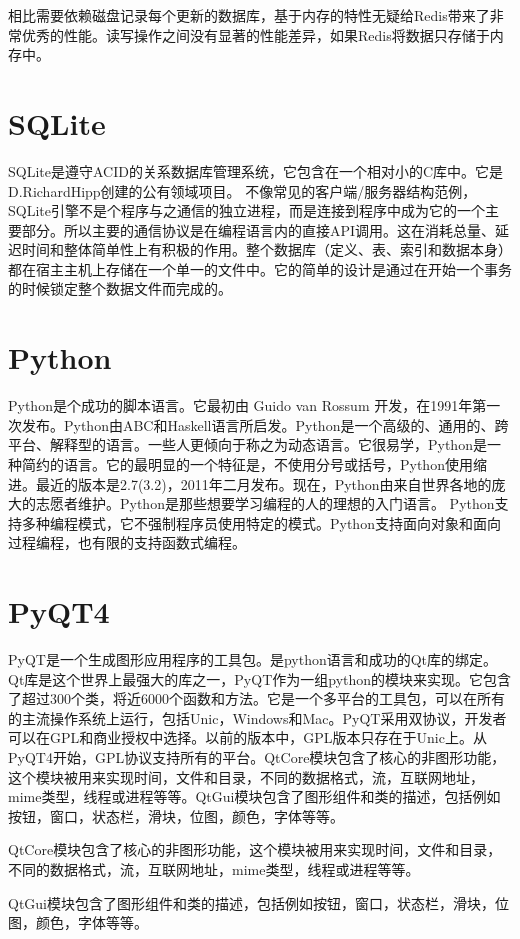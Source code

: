\documentclass{zjutthesis}
\begin{document}
相比需要依赖磁盘记录每个更新的数据库，基于内存的特性无疑给Redis带来了非常优秀的性能。读写操作之间没有显著的性能差异，如果Redis将数据只存储于内存中。


\section{SQLite}
SQLite是遵守ACID的关系数据库管理系统，它包含在一个相对小的C库中。它是D.RichardHipp创建的公有领域项目。
不像常见的客户端/服务器结构范例，SQLite引擎不是个程序与之通信的独立进程，而是连接到程序中成为它的一个主要部分。所以主要的通信协议是在编程语言内的直接API调用。这在消耗总量、延迟时间和整体简单性上有积极的作用。整个数据库（定义、表、索引和数据本身）都在宿主主机上存储在一个单一的文件中。它的简单的设计是通过在开始一个事务的时候锁定整个数据文件而完成的。

\section{Python}
Python是个成功的脚本语言。它最初由 Guido van Rossum 开发，在1991年第一次发布。Python由ABC和Haskell语言所启发。Python是一个高级的、通用的、跨平台、解释型的语言。一些人更倾向于称之为动态语言。它很易学，Python是一种简约的语言。它的最明显的一个特征是，不使用分号或括号，Python使用缩进。最近的版本是2.7(3.2)，2011年二月发布。现在，Python由来自世界各地的庞大的志愿者维护。Python是那些想要学习编程的人的理想的入门语言。
Python支持多种编程模式，它不强制程序员使用特定的模式。Python支持面向对象和面向过程编程，也有限的支持函数式编程。

\section{PyQT4}
PyQT是一个生成图形应用程序的工具包。是python语言和成功的Qt库的绑定。Qt库是这个世界上最强大的库之一，PyQT作为一组python的模块来实现。它包含了超过300个类，将近6000个函数和方法。它是一个多平台的工具包，可以在所有的主流操作系统上运行，包括Unic，Windows和Mac。PyQT采用双协议，开发者可以在GPL和商业授权中选择。以前的版本中，GPL版本只存在于Unic上。从PyQT4开始，GPL协议支持所有的平台。QtCore模块包含了核心的非图形功能，这个模块被用来实现时间，文件和目录，不同的数据格式，流，互联网地址，mime类型，线程或进程等等。QtGui模块包含了图形组件和类的描述，包括例如按钮，窗口，状态栏，滑块，位图，颜色，字体等等。

QtCore模块包含了核心的非图形功能，这个模块被用来实现时间，文件和目录，不同的数据格式，流，互联网地址，mime类型，线程或进程等等。

QtGui模块包含了图形组件和类的描述，包括例如按钮，窗口，状态栏，滑块，位图，颜色，字体等等。
\end{document}
